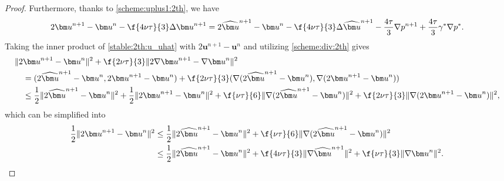 \begin{proof}
	Furthermore, thanks to \eqref{scheme:uplus1:2th}, we have
	\begin{equation}\label{stable:2th:u_uhat}
		2 {\bm u}^{n+1}-{\bm u}^n-\f{4\nu \tau}{3} \Delta {\bm u}^{n+1}=2 \widehat{\bm u}^{n+1}-{\bm u}^n-\f{4\nu \tau}{3} \Delta \widehat{\bm u}^{n+1}-\frac{4 \tau}{3} \nabla p^{n+1}+ \frac{4 \tau}{3} \gamma^{*}\nabla p^*.
	\end{equation}
	Taking the inner product of \eqref{stable:2th:u_uhat} with  $2 {\bm u}^{n+1}-{\bm u}^n$ and utilizing \eqref{scheme:div:2th} gives
	\begin{equation*}
		\begin{aligned}
			& \|2 {\bm u}^{n+1}-{\bm u}^n\|^2+\f{2\nu \tau}{3} \|2\nabla {\bm u}^{n+1}-\nabla {\bm u}^n\|^2 \\
			& \quad = (2 \widehat{{\bm u}}^{n+1}-{\bm u}^n, 2 {\bm u}^{n+1}-{\bm u}^n )+\f{2\nu \tau}{3} (\nabla (2\widehat{\bm u}^{n+1} -{\bm u}^{n} ), \nabla (2 {\bm u}^{n+1}-{\bm u}^n ))  \\
			& \quad \leq \frac{1}{2} \|2 \widehat{{\bm u}}^{n+1}-{\bm u}^n\|^2 + \frac{1}{2}\| 2 {\bm u}^{n+1}-{\bm u}^n \|^2 +\f{\nu \tau}{6} \|\nabla (2\widehat{\bm u}^{n+1} -{\bm u}^{n}) \|^2 + \f{2\nu \tau}{3} \|\nabla (2 {\bm u}^{n+1}-{\bm u}^n) \|^2,
		\end{aligned}
	\end{equation*}
	which can be simplified into
	\begin{equation}  \label{stabel:2th:uplus:2}
		\begin{aligned}
			\frac{1}{2}\|2 {\bm u}^{n+1}-{\bm u}^n\|^2  
			& \leq \frac{1}{2} \|2 \widehat{{\bm u}}^{n+1}-{\bm u}^n\|^2 +\f{\nu \tau}{6} \|\nabla (2\widehat{\bm u}^{n+1} -{\bm u}^{n}) \|^2 \\
			& \leq \frac{1}{2} \|2 \widehat{{\bm u}}^{n+1}-{\bm u}^n\|^2 + \f{4\nu \tau}{3} \|\nabla  \widehat{\bm u}^{n+1}\|^2 +\f{\nu \tau}{3}\|\nabla {\bm u}^{n} \|^2.
		\end{aligned}      
	\end{equation}
	

\end{proof}
